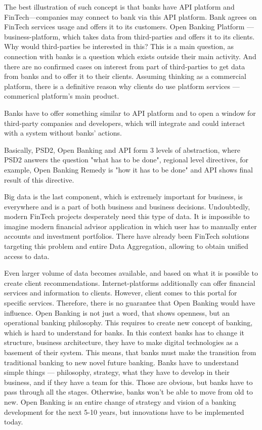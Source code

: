 The best illustration of such concept is that banks have API platform and FinTech—companies may connect to bank via this API platform.
Bank agrees on FinTech services usage and offers it to its customers.
Open Banking Platform — business-platform, which takes data from third-parties and offers it to its clients. Why would third-parties be interested in this?
This is a main question, as connection with banks is a question which exists outside their main activity.
And there are no confirmed cases on interest from part of third-parties to get data from banks and to offer it to their clients.
Assuming thinking as a commercial platform, there is a definitive reason why clients do use platform services — commerical platform's main product. 

Banks have to offer something similar to API platform and to open a window for third-party companies and developers, which will integrate and could interact with a system without banks' actions.

Basically, PSD2, Open Banking and API form 3 levels of abstraction, where PSD2 answers the question "what has to be done", regional level directives, for example, Open Banking Remedy is "how it has to be done" and API shows final result of this directive.

Big data is the last component, which is extremely important for business, is everywhere and is a part of both business and business decisions.
Undoubtedly, modern FinTech projects desperately need this type of data. 
It is impossible to imagine modern financial advisor application in which user has to manually enter accounts and investment portfolios. 
There have already been FinTech solutions targeting this problem and entire Data Aggregation, allowing to obtain unified access to data. 

Even larger volume of data becomes available, and based on what it is possible to create client recommendations.
Internet-platforms additionally can offer financial services and information to clients.
However, client comes to this portal for specific services.
Therefore, there is no guarantee that Open Banking would have influence.
Open Banking is not just a word, that shows openness, but an operational banking philosophy.
This requires to create new concept of banking, which is hard to understand for banks.
In this context banks has to change it structure, business architecture, they have to make digital technologies as a basement of their system.
This means, that banks must make the transition from traditional banking to new novel future banking.
Banks have to understand simple things — philosophy, strategy, what they have to develop in their business, and if they have a team for this.
Those are obvious, but banks have to pass through all the stages. 
Otherwise, banks won't be able to move from old to new.
Open Banking is an entire change of strategy and vision of a banking development for the next 5-10 years, but innovations have to be implemented today.

